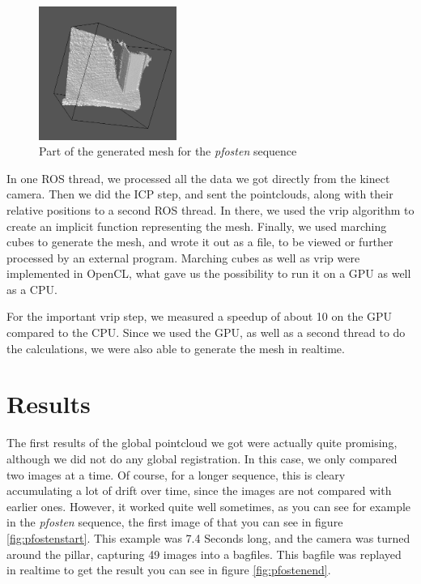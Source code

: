 \documentclass[10pt,twocolumn,letterpaper]{article}
\begin{document}
\begin{figure}
  \centering
  \includegraphics[width=0.4\textwidth]{pfostenmesh}
  \caption{Part of the generated mesh for the \textit{pfosten} sequence}
  \label{fig:pfostenmesh}
\end{figure}

In one ROS thread, we processed all the data we got directly from the kinect camera. Then we did the ICP step, and sent the pointclouds,
along with their relative positions to a second ROS thread. In there, we used the vrip algorithm \cite{vrip} to create an implicit
function representing the mesh. Finally, we used marching cubes to generate the mesh, and wrote it out as a file, to be viewed or further
processed by an external program. Marching cubes as well as vrip were implemented in OpenCL, what gave us the possibility to run it on a
GPU as well as a CPU.

For the important vrip step, we measured a speedup of about 10 on the GPU compared to the CPU.
Since we used the GPU, as well as a second thread to do the calculations, we were also able to generate the mesh in realtime.

\section{Results}
The first results of the global pointcloud we got were actually quite promising, although we did not do any global registration.
In this case, we only compared two images at a time. Of course, for a longer sequence, this is cleary accumulating a lot of
drift over time, since the images are not compared with earlier ones.
However, it worked quite well sometimes, as you can see for example in the \textit{pfosten} sequence, the first image of that you
can see in figure \ref{fig:pfostenstart}.
This example was 7.4 Seconds long, and the camera was turned around the pillar, capturing 49 images into a bagfiles.
This bagfile was replayed in realtime to get the result you can see in figure \ref{fig:pfostenend}.
\end{document}

